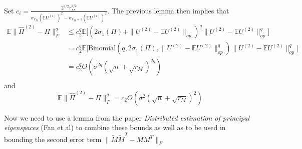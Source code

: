 \documentclass[notheorems]{beamer}
\theoremstyle{definition}
\begin{document}
\begin{frame}
Set $c_i = \frac{2^{3/2}r_M^{1/2}}{\sigma_{r_M}(\mathbb{E}U^{(i)})^2 - \sigma_{r_M + 1}(\mathbb{E}U^{(i)})^2}$. The previous lemma then implies that
\begin{align*}
    \mathbb{E}\|\hat{\Pi}^{(2)} - \Pi \|_F^q
    &\leq c_2^q \mathbb{E}\bigg[ (2 \sigma_1(\Pi) +  \|U^{(2)} - \mathbb{E}U^{(2)}\|_{op})^q \|U^{(2)} - \mathbb{E}U^{(2)}\|_{op}^q \bigg] \\
    &= c_2^q \mathbb{E}\bigg[\text{Binomial}(q, 2 \sigma_1(\Pi), \|U^{(2)} - \mathbb{E}U^{(2)}\|_{op}^{q} ) \|U^{(2)} - \mathbb{E}U^{(2)}\|_{op}^{q}  \bigg]\\
    &= c_2^q O(\sigma^{2q}(\sqrt{n} + \sqrt{r_M})^{2q})\\
\end{align*}
and 
$$\mathbb{E}\|\hat{\Pi}^{(2)} - \Pi \|_F^q = c_2 O(\sigma^2 (\sqrt{n} + \sqrt{r_M})^2)$$
\end{frame}















\begin{frame}
Now we need to use a lemma from the paper \emph{Distributed estimation of principal eigenspaces} (Fan et al) to combine these bounds as well as to be used in bounding the second error term $\|\tilde{M}\tilde{M}^T - MM^T\|_F$ 
\end{frame}


















\end{document}
